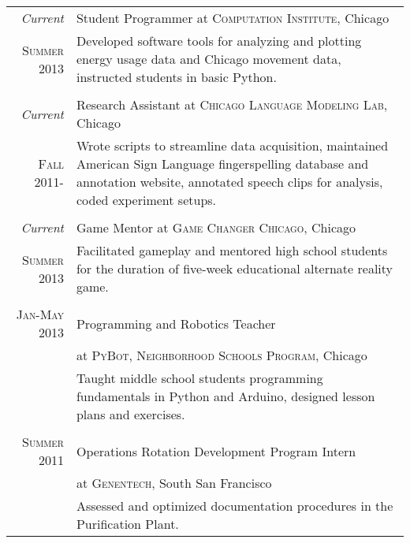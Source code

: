 \documentclass[a4paper,10pt]{article} %
\begin{document}
\begin{tabular}{r|p{11cm}}
\emph{Current} & Student Programmer at \textsc{Computation Institute}, Chicago\\
\textsc{Summer 2013} & \footnotesize{Developed software tools for analyzing and plotting energy usage data and Chicago movement data, instructed students in basic Python.}\\
\multicolumn{2}{c}{} \\


\emph{Current} & Research Assistant at \textsc{Chicago Language Modeling Lab}, Chicago \emph{}\\
\textsc{Fall 2011-} & \footnotesize{Wrote scripts to streamline data acquisition, maintained American Sign Language fingerspelling database and annotation website, annotated speech clips for analysis, coded experiment setups.} \\
\multicolumn{2}{c}{} \\


\emph{Current} & Game Mentor at \textsc{Game Changer Chicago}, Chicago\\
\textsc{Summer 2013} & \footnotesize{Facilitated gameplay and mentored high school students for the duration of five-week educational alternate reality game.}\\
\multicolumn{2}{c}{} \\


\textsc{Jan-May 2013} & Programming and Robotics Teacher\\ 
& at \textsc{PyBot, Neighborhood Schools Program}, Chicago\\
& \footnotesize{Taught middle school students programming fundamentals in Python and Arduino, designed lesson plans and exercises.} \\
\multicolumn{2}{c}{} \\

\textsc{Summer 2011} & Operations Rotation Development Program Intern\\ 
& at \textsc{Genentech}, South San Francisco\\
& \footnotesize{Assessed and optimized documentation procedures in the Purification Plant.}
\end{tabular}

\end{document}
